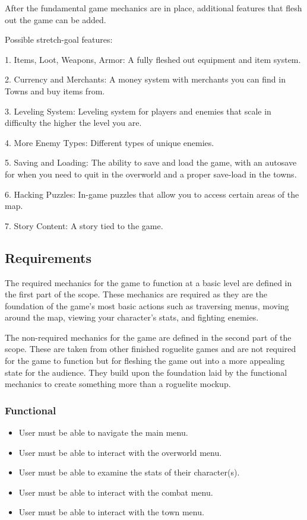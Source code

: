 \documentclass[10pt,conference,onecolumn,compsoc]{IEEEtran}
\begin{document}
After the fundamental game mechanics are in place, additional features that flesh out the game can be added.

Possible stretch-goal features:
\begin{flushleft}
1. Items, Loot, Weapons, Armor: A fully fleshed out equipment and item system.

2. Currency and Merchants: A money system with merchants you can find in Towns and buy items from.

3. Leveling System: Leveling system for players and enemies that scale in difficulty the higher the level you are.

4. More Enemy Types: Different types of unique enemies.

5. Saving and Loading: The ability to save and load the game, with an autosave for when you need to quit in the overworld and a proper save-load in the towns.

6. Hacking Puzzles: In-game puzzles that allow you to access certain areas of the map.

7. Story Content: A story tied to the game.
\end{flushleft}



\subsection{Requirements}
The required mechanics for the game to function at a basic level are defined in the first part of the scope. These mechanics are required as they are the foundation of the game's most basic actions such as traversing menus, moving around the map, viewing your character's stats, and fighting enemies.

The non-required mechanics for the game are defined in the second part of the scope. These are taken from other finished roguelite games and are not required for the game to function but for fleshing the game out into a more appealing state for the audience. They build upon the foundation laid by the functional mechanics to create something more than a roguelite mockup.

\subsubsection{Functional}
\begin{itemize}
\item User must be able to navigate the main menu.
\item User must be able to interact with the overworld menu.
\item User must be able to examine the stats of their character(s).
\item User must be able to interact with the combat menu.
\item User must be able to interact with the town menu.
\end{itemize}
\end{document}
